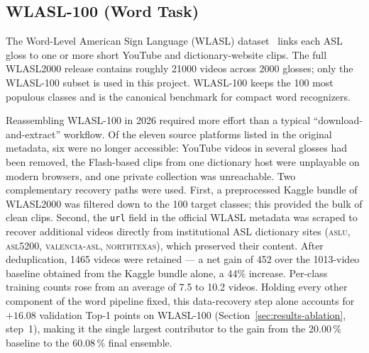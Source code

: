 \subsection{WLASL-100 (Word Task)}
\label{sec:impl-data-wlasl}

The Word-Level American Sign Language (WLASL)
dataset~\cite{li2020wlasl} links each ASL gloss to one or more short
YouTube and dictionary-website clips. The full WLASL2000 release
contains roughly \num{21000} videos across \num{2000} glosses; only
the WLASL-100 subset is used in this project. WLASL-100 keeps the 100
most populous classes and is the canonical benchmark for compact word
recognizers.

Reassembling WLASL-100 in 2026 required more effort than a typical
``download-and-extract'' workflow. Of the eleven source platforms
listed in the original metadata, six were no longer accessible:
YouTube videos in several glosses had been removed, the Flash-based
clips from one dictionary host were unplayable on modern browsers,
and one private collection was unreachable. Two complementary
recovery paths were used. First, a preprocessed Kaggle bundle of
WLASL2000 was filtered down to the 100 target classes; this provided
the bulk of clean clips. Second, the \texttt{url} field in the
official WLASL metadata was scraped to recover additional
videos directly from institutional ASL dictionary sites
(\textsc{aslu}, \textsc{asl5200}, \textsc{valencia-asl},
\textsc{northtexas}), which preserved their content. After
deduplication, \num{1465} videos were retained --- a net gain of
\num{452} over the \num{1013}-video baseline obtained from the Kaggle
bundle alone, a 44\% increase.
Per-class training counts rose from an average of 7.5 to 10.2 videos.
Holding every other component of the word pipeline fixed, this
data-recovery step alone accounts for $+16.08$ validation Top-1
points on WLASL-100 (Section~\ref{sec:results-ablation}, step~1),
making it the single largest contributor to the gain from the
20.00\,\% baseline to the 60.08\,\% final ensemble.

